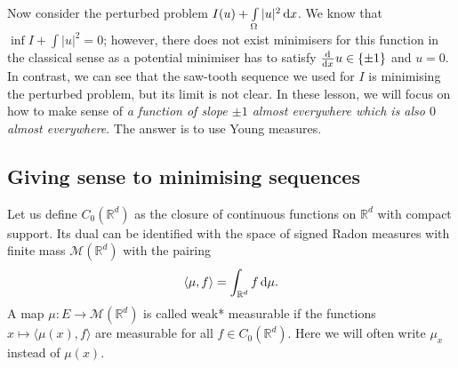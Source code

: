 \documentclass[a4paper,doc,11pt]{article}
\newcommand{\R}{\mathbb{R}}
\begin{document}
Now consider the perturbed problem \( I(u) + \int\limits_\Omega |u|^2 \dif x \). We know that \( \inf I + \int |u|^2 = 0\); however, there does not exist minimisers for this function in the classical sense as a potential minimiser has to satisfy \(\od{ }{x} u \in \{\pm 1\}\) and \(u = 0\). In contrast, we can see that the saw-tooth sequence we used for \(I\) is minimising the perturbed problem, but its limit is not clear. In these lesson, we will focus on how to make sense of \emph{a function of slope \(\pm 1\) almost everywhere which is also \(0\) almost everywhere}. The answer is to use Young measures.


\subsection{Giving sense to minimising sequences}

Let us define \(C_0(\R^d)\) as the closure of continuous functions on \(\R^d\) with compact support. Its dual can be identified with the space of signed Radon measures with finite mass \(\mathcal{M}(\R^d)\) with the pairing
\[
    \langle \mu,f \rangle = \int_{\R^d} f \dif \mu.
\]
A map \(\mu : E \to \mathcal{M}(\R^d)\) is called weak* measurable if the functions \(x \mapsto \langle \mu(x), f\rangle\) are measurable for all \(f\in C_0 (\R^d)\). Here we will often write \(\mu_x\) instead of \(\mu(x)\).
\end{document}

